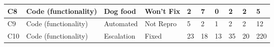 \begin{landscape}
\begin{table}[tbp]
{\begin{tabular}{p{1.6cm}p{2.6cm}p{2.2cm}p{2.2cm}p{1.6cm}p{1.6cm}p{1.6cm}p{1.6cm}p{1.6cm}p{1.6cm}}
\hline
\vspace{0.5pt} C8 & \vspace{0.5pt} Code (functionality) & \vspace{0.5pt} Dog food & \vspace{0.5pt} Won't Fix & \vspace{0.5pt} 2 & \vspace{0.5pt} 7 & \vspace{0.5pt} 0 & \vspace{0.5pt} 2 & \vspace{0.5pt} 2 & \vspace{0.5pt} 5 \\
\hline
\vspace{0.5pt} C9 & \vspace{0.5pt} Code (functionality) & \vspace{0.5pt} Automated & \vspace{0.5pt} Not Repro & \vspace{0.5pt} 5 & \vspace{0.5pt} 2 & \vspace{0.5pt} 1 & \vspace{0.5pt} 2 & \vspace{0.5pt} 2 & \vspace{0.5pt} 12 \\
\hline
\vspace{0.5pt} C10 & \vspace{0.5pt} Code (functionality) & \vspace{0.5pt} Escalation & \vspace{0.5pt} Fixed & \vspace{0.5pt} 23 & \vspace{0.5pt} 18 & \vspace{0.5pt} 13 & \vspace{0.5pt} 35 & \vspace{0.5pt} 20 & \vspace{0.5pt} 220 \\
\hline
\end{tabular}}
\end{table}
\end{landscape}

